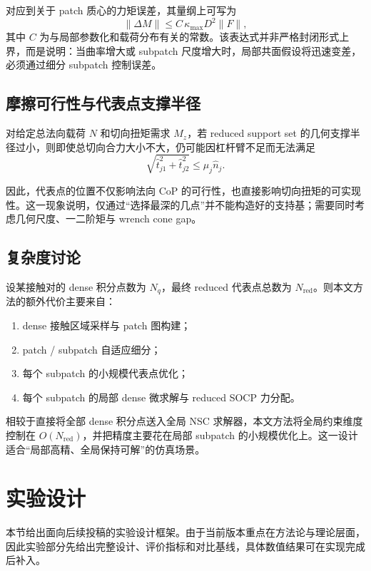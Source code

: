 \documentclass[UTF8,a4paper,11pt]{ctexart}
\begin{document}
对应到关于 patch 质心的力矩误差，其量纲上可写为
\begin{equation}
\|\Delta M\| \le C\,\kappa_{\max}D^2\|F\|,
\end{equation}
其中 $C$ 为与局部参数化和载荷分布有关的常数。该表达式并非严格封闭形式上界，而是说明：当曲率增大或 subpatch 尺度增大时，局部共面假设将迅速变差，必须通过细分 subpatch 控制误差。

\subsection{摩擦可行性与代表点支撑半径}

对给定总法向载荷 $N$ 和切向扭矩需求 $M_z$，若 reduced support set 的几何支撑半径过小，则即使总切向合力大小不大，仍可能因杠杆臂不足而无法满足
\begin{equation}
\sqrt{\hat{t}_{j1}^2+\hat{t}_{j2}^2}\le \mu_j\hat{n}_j.
\end{equation}

因此，代表点的位置不仅影响法向 CoP 的可行性，也直接影响切向扭矩的可实现性。这一现象说明，仅通过“选择最深的几点”并不能构造好的支持基；需要同时考虑几何尺度、一二阶矩与 wrench cone gap。

\subsection{复杂度讨论}

设某接触对的 dense 积分点数为 $N_q$，最终 reduced 代表点总数为 $N_{\mathrm{red}}$。则本文方法的额外代价主要来自：
\begin{enumerate}[label=(\arabic*)]
    \item dense 接触区域采样与 patch 图构建；
    \item patch / subpatch 自适应细分；
    \item 每个 subpatch 的小规模代表点优化；
    \item 每个 subpatch 的局部 dense 微求解与 reduced SOCP 力分配。
\end{enumerate}

相较于直接将全部 dense 积分点送入全局 NSC 求解器，本文方法将全局约束维度控制在 $O(N_{\mathrm{red}})$，并把精度主要花在局部 subpatch 的小规模优化上。这一设计适合“局部高精、全局保持可解”的仿真场景。

\section{实验设计}
\label{sec:experiments}

本节给出面向后续投稿的实验设计框架。由于当前版本重点在方法论与理论层面，因此实验部分先给出完整设计、评价指标和对比基线，具体数值结果可在实现完成后补入。
\end{document}

